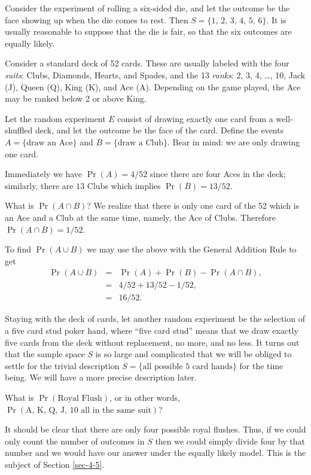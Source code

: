 \documentclass[captions=tableheading]{scrbook}
\begin{document}
\begin{example}
Consider the experiment of rolling a six-sided die, and let the outcome be the face showing up when the die comes to rest. Then \( S = \{ 1,\,2,\,3,\,4,\,5,\,6 \} \). It is usually reasonable to suppose that the die is fair, so that the six outcomes are equally likely.
\end{example}

\begin{example}
Consider a standard deck of 52 cards. These are usually labeled with the four \emph{suits}: Clubs, Diamonds, Hearts, and Spades, and the 13 \emph{ranks}: 2, 3, 4, \ldots{}, 10, Jack (J), Queen (Q), King (K), and Ace (A). Depending on the game played, the Ace may be ranked below 2 or above King. 

Let the random experiment \(E\) consist of drawing exactly one card from a well-shuffled deck, and let the outcome be the face of the card. Define the events \( A = \{ \mbox{draw an Ace} \} \) and \( B = \{ \mbox{draw a Club} \} \). Bear in mind: we are only drawing one card.

Immediately we have \(\Pr(A)=4/52\) since there are four Aces in the deck; similarly, there are \(13\) Clubs which implies \(\Pr(B)=13/52\).

What is \(\Pr(A\cap B)\)? We realize that there is only one card of the 52 which is an Ace and a Club at the same time, namely, the Ace of Clubs. Therefore \(\Pr(A\cap B)=1/52\).

To find \(\Pr(A\cup B)\) we may use the above with the General Addition Rule to get
\begin{eqnarray*}
\Pr(A\cup B) & = & \Pr(A)+\Pr(B)-\Pr(A\cap B),\\
 & = & 4/52+13/52-1/52,\\
 & = & 16/52.
\end{eqnarray*}

\end{example}

\begin{example}
Staying with the deck of cards, let another random experiment be the selection of a five card stud poker hand, where ``five card stud'' means that we draw exactly five cards from the deck without replacement, no more, and no less. It turns out that the sample space \(S\) is so large and complicated that we will be obliged to settle for the trivial description \( S = \{ \mbox{all possible 5 card hands} \} \) for the time being. We will have a more precise description later.

What is \(\Pr(\mbox{Royal Flush})\), or in other words, \(\Pr(\mbox{A, K, Q, J, 10 all in the same suit})\)? 

It should be clear that there are only four possible royal flushes. Thus, if we could only count the number of outcomes in \(S\) then we could simply divide four by that number and we would have our answer under the equally likely model. This is the subject of Section \ref{sec-4-5}.

\end{example}
\end{document}
